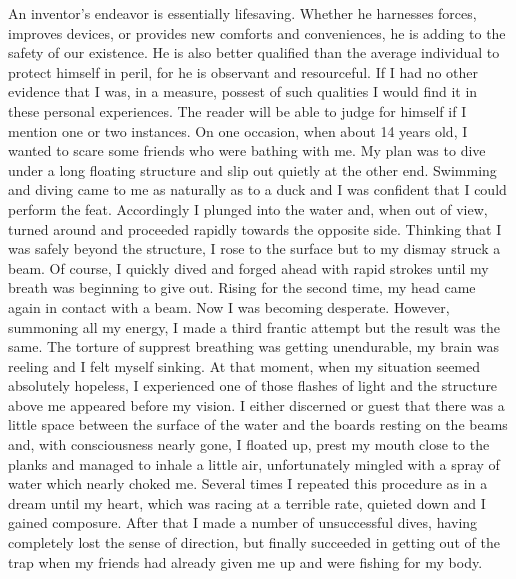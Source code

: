 \documentclass[a4paper,12pt,english,twoside,openright]{memoir}
\begin{document}
	An inventor's endeavor is essentially lifesaving.  Whether he harnesses forces, improves devices, 
	or provides new comforts and conveniences, he is adding to the safety of our existence.  He is 
	also better qualified than the average individual to protect himself in peril, for he is observant and 
	resourceful.  If I had no other evidence that I was, in a measure, possest of such qualities I would 
	find it in these personal experiences.  The reader will be able to judge for himself if I mention one 
	or two instances.  On one occasion, when about 14 years old, I wanted to scare some friends 
	who were bathing with me.  My plan was to dive under a long floating structure and slip out 
	quietly at the other end.  Swimming and diving came to me as naturally as to a duck and I was 
	confident that I could perform the feat.  Accordingly I plunged into the water and, when out of 
	view, turned around and proceeded rapidly towards the opposite side.  Thinking that I was safely 
	beyond the structure, I rose to the surface but to my dismay struck a beam.  Of course, I quickly 
	dived and forged ahead with rapid strokes until my breath was beginning to give out.  Rising for 
	the second time, my head came again in contact with a beam.  Now I was becoming desperate.  
	However, summoning all my energy, I made a third frantic attempt but the result was the same.  
	The torture of supprest breathing was getting unendurable, my brain was reeling and I felt myself 
	sinking.  At that moment, when my situation seemed absolutely hopeless, I experienced one of 
	those flashes of light and the structure above me appeared before my vision.  I either discerned 
	or guest that there was a little space between the surface of the water and the boards resting on 
	the beams and, with consciousness nearly gone, I floated up, prest my mouth close to the planks 
	and managed to inhale a little air, unfortunately mingled with a spray of water which nearly 
	choked me.  Several times I repeated this procedure as in a dream until my heart, which was 
	racing at a terrible rate, quieted down and I gained composure.  After that I made a number of 
	unsuccessful dives, having completely lost the sense of direction, but finally succeeded in getting 
	out of the trap when my friends had already given me up and were fishing for my body.  
	
\end{document}
